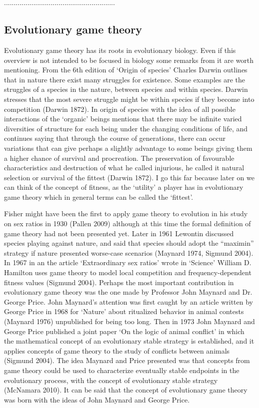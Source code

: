 \documentclass{article}
\begin{document}
\\\\.........................................................

\subsection{Evolutionary game theory}
Evolutionary game theory has its roots in evolutionary biology. Even if this overview is not intended to be focused in biology some remarks from it are worth mentioning. From the 6th edition of ‘Origin of species’ Charles Darwin outlines that in nature there exist many struggles for existence. Some examples are the struggles of a species in the nature, between species and within species. Darwin stresses that the most severe struggle might be within species if they become into competition (Darwin 1872). In origin of species with the idea of all possible interactions of the ‘organic’ beings mentions that there may be infinite varied diversities of structure for each being under the changing conditions of life, and continues saying that through the course of generations, there can occur variations that can give perhaps a slightly advantage to some beings giving them a higher chance of survival and procreation. The preservation of favourable characteristics and destruction of what he called injurious, he called it natural selection or survival of the fittest (Darwin 1872). I go this far because later on we can think of the concept of fitness, as the ‘utility’ a player has in evolutionary game theory which in general terms can be called the ‘fittest’.

Fisher might have been the first to apply game theory to evolution in his study on sex ratios in 1930 (Pallen 2009) although at this time the formal definition of game theory had not been presented yet. Later in 1961 Lewontin discussed species playing against nature, and said that species should adopt the “maximin” strategy if nature presented worse-case scenarios (Maynard 1974, Sigmund 2004). In 1967 in an the article ‘Extraordinary sex ratios’ wrote in ‘Science’ William D. Hamilton uses game theory to model local competition and frequency-dependent fitness values (Sigmund 2004). Perhaps the most important contribution in evolutionary game theory was the one made by Professor John Maynard and Dr. George Price. John Maynard’s attention was first caught by an article written by George Price in 1968 for ‘Nature’ about ritualized behavior in animal contests (Maynard 1976) unpublished for being too long. Then in 1973 John Maynard and George Price published a joint paper ‘On the logic of animal conflict’ in which the mathematical concept of an evolutionary stable strategy is established, and it applies concepts of game theory to the study of conflicts between animals (Sigmund 2004).  The idea Maynard and Price presented was that concepts from game theory could be used to characterize eventually stable endpoints in the evolutionary process, with the concept of evolutionary stable strategy (McNamara 2010). It can be said that the concept of evolutionary game theory was born with the ideas of John Maynard and George Price.
\end{document}
